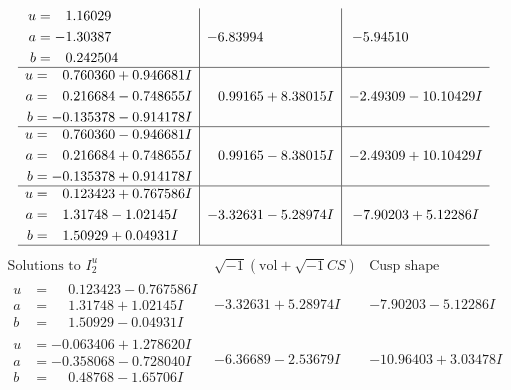 \documentclass[1p]{elsarticle_modified}
\theoremstyle{definition}
\newcommand{\I}{\sqrt{-1}}
\begin{document}
$$\begin{array}{c|c|c}
\begin{aligned}
u &= \phantom{-}1.16029\phantom{ +0.000000I} \\
a &= -1.30387\phantom{ +0.000000I} \\
b &= \phantom{-}0.242504\phantom{ +0.000000I}\end{aligned}
 & -6.83994\phantom{ +0.000000I} & -5.94510\phantom{ +0.000000I} \\ \hline\begin{aligned}
u &= \phantom{-}0.760360 + 0.946681 I \\
a &= \phantom{-}0.216684 - 0.748655 I \\
b &= -0.135378 - 0.914178 I\end{aligned}
 & \phantom{-}0.99165 + 8.38015 I & -2.49309 - 10.10429 I \\ \hline\begin{aligned}
u &= \phantom{-}0.760360 - 0.946681 I \\
a &= \phantom{-}0.216684 + 0.748655 I \\
b &= -0.135378 + 0.914178 I\end{aligned}
 & \phantom{-}0.99165 - 8.38015 I & -2.49309 + 10.10429 I \\ \hline\begin{aligned}
u &= \phantom{-}0.123423 + 0.767586 I \\
a &= \phantom{-}1.31748 - 1.02145 I \\
b &= \phantom{-}1.50929 + 0.04931 I\end{aligned}
 & -3.32631 - 5.28974 I & -7.90203 + 5.12286 I\\
 \hline 
 \end{array}$$\newpage$$\begin{array}{c|c|c}  
\text{Solutions to }I^u_{2}& \I (\text{vol} + \sqrt{-1}CS) & \text{Cusp shape}\\
 \hline 
\begin{aligned}
u &= \phantom{-}0.123423 - 0.767586 I \\
a &= \phantom{-}1.31748 + 1.02145 I \\
b &= \phantom{-}1.50929 - 0.04931 I\end{aligned}
 & -3.32631 + 5.28974 I & -7.90203 - 5.12286 I \\ \hline\begin{aligned}
u &= -0.063406 + 1.278620 I \\
a &= -0.358068 - 0.728040 I \\
b &= \phantom{-}0.48768 - 1.65706 I\end{aligned}
 & -6.36689 - 2.53679 I & -10.96403 + 3.03478 I \\ \hline\begin{aligned}

\end{aligned}
\end{array}$$
\end{document}
